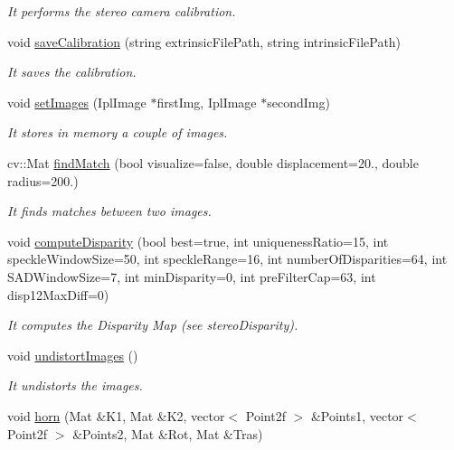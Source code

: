 \begin{DoxyCompactItemize}
\begin{DoxyCompactList}\small\item\em It performs the stereo camera calibration. \end{DoxyCompactList}\item 
void \hyperlink{classStereoCamera_a9f06cd4b170ad0ba45b681ee93d64851}{save\+Calibration} (string extrinsic\+File\+Path, string intrinsic\+File\+Path)
\begin{DoxyCompactList}\small\item\em It saves the calibration. \end{DoxyCompactList}\item 
void \hyperlink{classStereoCamera_a5e24f7d17a11adb4a6310df7f7e2de5b}{set\+Images} (Ipl\+Image $\ast$first\+Img, Ipl\+Image $\ast$second\+Img)
\begin{DoxyCompactList}\small\item\em It stores in memory a couple of images. \end{DoxyCompactList}\item 
cv\+::\+Mat \hyperlink{classStereoCamera_aeb1cf4e41058cd70c7df6b8c2511548d}{find\+Match} (bool visualize=false, double displacement=20., double radius=200.)
\begin{DoxyCompactList}\small\item\em It finds matches between two images. \end{DoxyCompactList}\item 
void \hyperlink{classStereoCamera_a79e986f2970bb2c5b5acd1ede65984aa}{compute\+Disparity} (bool best=true, int uniqueness\+Ratio=15, int speckle\+Window\+Size=50, int speckle\+Range=16, int number\+Of\+Disparities=64, int S\+A\+D\+Window\+Size=7, int min\+Disparity=0, int pre\+Filter\+Cap=63, int disp12\+Max\+Diff=0)
\begin{DoxyCompactList}\small\item\em It computes the Disparity Map (see stereo\+Disparity). \end{DoxyCompactList}\item 
void \hyperlink{classStereoCamera_a2751f357e5fabc7099303d45425208d7}{undistort\+Images} ()
\begin{DoxyCompactList}\small\item\em It undistorts the images. \end{DoxyCompactList}\item 
void \hyperlink{classStereoCamera_adf155975709fdbf09d3133899d074a02}{horn} (Mat \&K1, Mat \&K2, vector$<$ Point2f $>$ \&Points1, vector$<$ Point2f $>$ \&Points2, Mat \&Rot, Mat \&Tras)

\end{DoxyCompactItemize}
